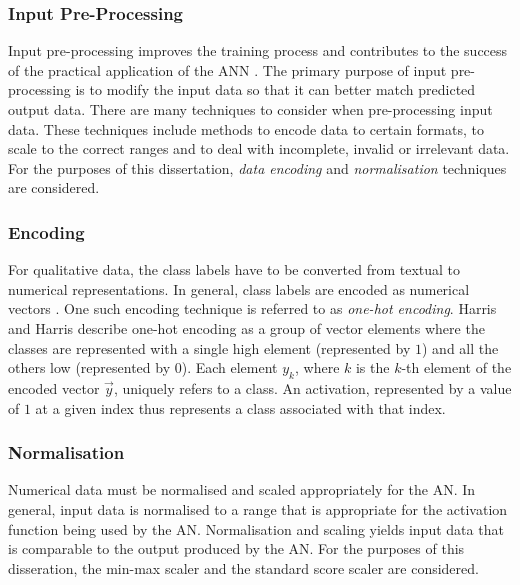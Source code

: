 \subsubsection{Input Pre-Processing}\label{sec:anns:an:input:input_pre_processing}

Input pre-processing improves the training process and contributes to the success of the practical application of the \acs{ANN} \cite{ref:kuzniar:2017}. The primary purpose of input pre-processing is to modify the input data so that it can better match predicted output data. There are many techniques to consider when pre-processing input data. These techniques include methods to encode data to certain formats, to scale to the correct ranges and to deal with incomplete, invalid or irrelevant data. For the purposes of this dissertation, \textit{data encoding} and \textit{normalisation} techniques are considered.


\subsubsection{Encoding}\label{sec:anns:an:input:encoding}

For qualitative data, the class labels have to be converted from textual to numerical representations. In general, class labels are encoded as numerical vectors \cite{ref:srinidhi:2018, ref:brownlee:2017:one-hot}. One such encoding technique is referred to as \textit{one-hot encoding}. Harris and Harris \cite{ref:harris:2010} describe one-hot encoding as a group of vector elements where the classes are represented with a single high element (represented by $1$) and all the others low (represented by $0$). Each element $y_k$, where $k$ is the $k$-th element of the encoded vector $\vec{y}$, uniquely refers to a class. An activation, represented by a value of $1$ at a given index thus represents a class associated with that index.

\subsubsection{Normalisation}\label{sec:anns:an:input:normalisation}

Numerical data must be normalised and scaled appropriately for the \acs{AN}. In general, input data is normalised to a range that is appropriate for the activation function being used by the \acs{AN}. Normalisation and scaling yields input data that is comparable to the output produced by the \acs{AN}. For the purposes of this disseration, the min-max scaler \cite{ref:al:2006} and the standard score scaler \cite{ref:jain:2005} are considered.

